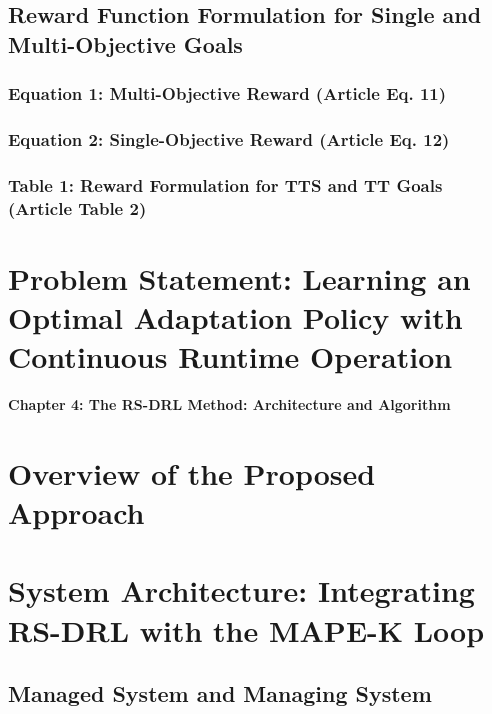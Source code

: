 \documentclass[11pt,a4paper]{article}
\begin{document}
\subsection{Reward Function Formulation for Single and Multi-Objective Goals}
\subsubsection{Equation 1: Multi-Objective Reward (Article Eq. 11)}
\subsubsection{Equation 2: Single-Objective Reward (Article Eq. 12)}
\subsubsection{Table 1: Reward Formulation for TTS and TT Goals (Article Table 2)}

\section{Problem Statement: Learning an Optimal Adaptation Policy with Continuous Runtime Operation}

\newpage

\vspace*{1cm}
{\centering \huge \textbf{Chapter 4: The RS-DRL Method: Architecture and Algorithm} \par}
\vspace{1cm}

\setcounter{section}{0}
\renewcommand{\thesection}{4.\arabic{section}}
\renewcommand{\thesubsection}{4.\arabic{section}.\arabic{subsection}}

\section{Overview of the Proposed Approach}

\section{System Architecture: Integrating RS-DRL with the MAPE-K Loop}
\subsection{Managed System and Managing System}
\end{document}
